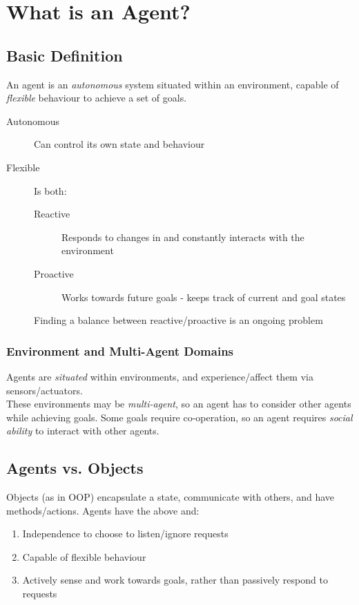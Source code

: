 \section{What is an Agent?}

\subsection{Basic Definition}
An agent is an \emph{autonomous} system situated within an environment, capable of \emph{flexible} behaviour to achieve a set of goals. 

\begin{description}
    \item[Autonomous] Can control its own state and behaviour
    \item[Flexible] Is both:
    \begin{description}
        \item[Reactive] Responds to changes in and constantly interacts with the environment
        \item[Proactive] Works towards future goals - keeps track of current and goal states
    \end{description}
    Finding a balance between reactive/proactive is an ongoing problem
\end{description}

\subsubsection{Environment and Multi-Agent Domains}
Agents are \emph{situated} within environments, and experience/affect them via sensors/actuators. \\

These environments may be \emph{multi-agent}, so an agent has to consider other agents while achieving goals. Some goals require co-operation, so an agent requires \emph{social ability} to interact with other agents.

\subsection{Agents vs. Objects}

Objects (as in OOP) encapsulate a state, communicate with others, and have methods/actions. 
Agents have the above and:
\begin{enumerate}
    \item Independence to choose to listen/ignore requests
    \item Capable of flexible behaviour
    \item Actively sense and work towards goals, rather than passively respond to requests
\end{enumerate}{}

